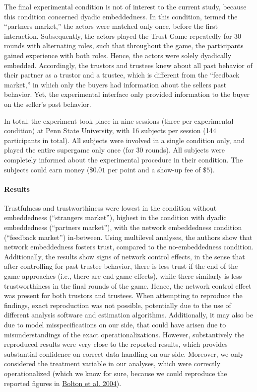 \documentclass[
  11pt,
]{article}
\begin{document}
The final experimental condition is not of interest to the current study, because this condition concerned dyadic embeddedness.
In this condition, termed the ``partners market,'' the actors were matched only once, before the first interaction. Subsequently, the actors played the Trust Game repeatedly for 30 rounds with alternating roles, such that throughout the game, the participants gained experience with both roles.
Hence, the actors were solely dyadically embedded.
Accordingly, the trustors and trustees knew about all past behavior of their partner as a trustor and a trustee, which is different from the ``feedback market,'' in which only the buyers had information about the sellers past behavior.
Yet, the experimental interface only provided information to the buyer on the seller's past behavior.

In total, the experiment took place in nine sessions (three per experimental condition) at Penn State University, with 16 subjects per session (144 participants in total). All subjects were involved in a single condition only, and played the entire supergame only once (for 30 rounds). All subjects were completely informed about the experimental procedure in their condition. The subjects could earn money (\(\$0.01\) per point and a show-up fee of \(\$5\)).

\hypertarget{results-1}{%
\paragraph{Results}\label{results-1}}

Trustfulness and trustworthiness were lowest in the condition without embeddedness (``strangers market''), highest in the condition with dyadic embeddedness (``partners market''), with the network embeddedness condition (``feedback market'') in-between.
Using multilevel analyses, the authors show that network embeddedness fosters trust, compared to the no-embeddedness condition.
Additionally, the results show signs of network control effects, in the sense that after controlling for past trustee behavior, there is less trust if the end of the game approaches (i.e., there are end-game effects), while there similarly is less trustworthiness in the final rounds of the game.
Hence, the network control effect was present for both trustors and trustees.
When attempting to reproduce the findings, exact reproduction was not possible, potentially due to the use of different analysis software and estimation algorithms.
Additionally, it may also be due to model misspecifications on our side, that could have arisen due to misunderstandings of the exact operationalizations.
However, substantively the reproduced results were very close to the reported results, which provides substantial confidence on correct data handling on our side.
Moreover, we only considered the treatment variable in our analyses, which were correctly operationalized (which we know for sure, because we could reproduce the reported figures in \protect\hyperlink{ref-bolton_electronic_2004}{Bolton et al. 2004}).
\end{document}
